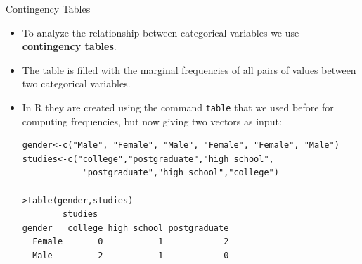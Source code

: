 \documentclass[handout]{beamer}
\begin{document}
\begin{frame}[fragile]{Contingency Tables}
\scriptsize{
\begin{itemize}
 \item To analyze the relationship between categorical variables  we use \textbf{contingency tables}.
 \item The table is filled with the marginal frequencies of all pairs of values between two categorical variables.
 \item In R they are created using the command \verb+table+ that we used before for computing frequencies, but now giving two vectors as input:
 \begin{verbatim}
gender<-c("Male", "Female", "Male", "Female", "Female", "Male")
studies<-c("college","postgraduate","high school",
            "postgraduate","high school","college")
            
>table(gender,studies)
        studies
gender   college high school postgraduate
  Female       0           1            2
  Male         2           1            0
 \end{verbatim}

 
 
\end{itemize}


} 
\end{frame}
\end{document}
